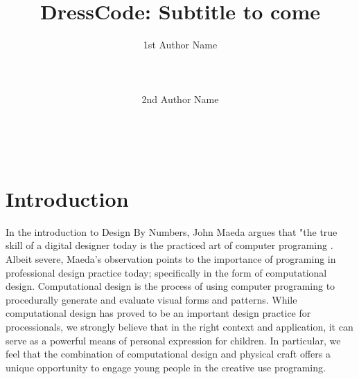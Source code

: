 \documentclass{sigchi}
\begin{document}
\title{DressCode: Subtitle to come}

\author{
 \alignauthor 1st Author Name\\
 \\
 \\
 \\
 \alignauthor 2nd Author Name\\
 \\
 \\
 \\
}

\maketitle

\begin{abstract}
\end{abstract}



\section{Introduction} %

  In the introduction to Design By Numbers, John Maeda argues that "the true skill of a digital designer today is the practiced art of computer programing \cite{maeda}. Albeit severe, Maeda's observation points to the importance of programing in professional design practice today; specifically in the form of computational design. Computational design is the process of using computer programing to procedurally generate and evaluate visual forms and patterns. While computational design has proved to be an important design practice for processionals, we strongly believe that in the right context and application, it can serve as a powerful means of personal expression for children. In particular, we feel that the combination of computational design and physical craft offers a unique opportunity to engage young people in the creative use programing.
\end{document}
